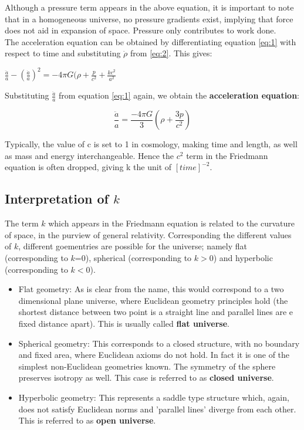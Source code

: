 \documentclass{article}
\begin{document}
Although a pressure term appears in the above equation, it is important to note that in a homogeneous universe, no pressure gradients exist, implying that force does not aid in expansion of space. Pressure only contributes to work done.
\\
The acceleration equation can be obtained by differentiating equation \ref{eq:1} with respect to time and substituting $\dot{\rho}$ from \ref{eq:2}. This gives:

\begin{center}
    $\frac{\ddot{a}}{a}-(\frac{\dot{a}}{a})^2=-4{\pi}G(\rho+\frac{p}{c^2}+\frac{kc^2}{a^2}$
\end{center}

Substituting $\frac{\ddot{a}}{a}$ from equation \ref{eq:1} again, we obtain the \textbf{acceleration equation}:

\begin{equation}
    \frac{\ddot{a}}{a}=\frac{-4{\pi}G}{3}(\rho+\frac{3p}{c^2})
\end{equation}

Typically, the value of c is set to 1 in cosmology, making time and length, as well as mass and energy interchangeable. Hence the $c^2$ term in the Friedmann equation is often dropped, giving k the unit of $[time]^{-2}$.

\subsection{Interpretation of $k$}

The term $k$ which appears in the Friedmann equation is related to the curvature of space, in the purview of general relativity. Corresponding the different values of $k$, different goementries are possible for the universe; namely flat (corresponding to $k$=0), spherical (corresponding to $k>0$) and hyperbolic (corresponding to $k<0$).

\begin{itemize}
    \item Flat geometry: As is clear from the name, this would correspond to a two dimensional plane universe, where Euclidean geometry principles hold (the shortest distance between two point is a straight line and parallel lines are e fixed distance apart). This is usually called \textbf{flat universe}.
    \item Spherical geometry: This corresponds to a closed structure, with no boundary and fixed area, where Euclidean axioms do not hold. In fact it is one of the simplest non-Euclidean geometries known. The symmetry of the sphere preserves isotropy as well. This case is referred to as \textbf{closed universe}.
    \item Hyperbolic geometry: This represents a saddle type structure which, again, does not satisfy Euclidean norms and 'parallel lines' diverge from each other. This is referred to as \textbf{open universe}.
\end{itemize}
\end{document}
